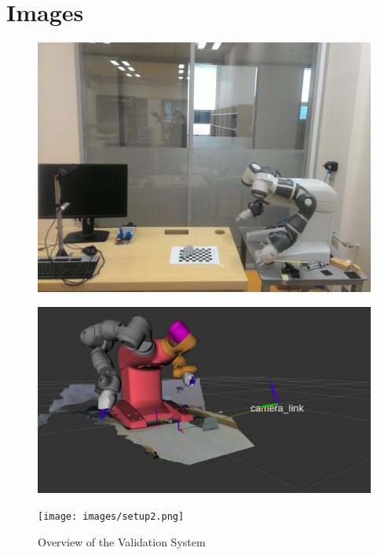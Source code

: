 \appendix
\chapter*{Images}
\label{chap:results}


\begin{figure}[htp]
\begin{center}
{
  \includegraphics[clip,width=0.5\columnwidth]{images/setup1.jpg}
}
\end{center}
\begin{center}
{
  \includegraphics[clip,width=0.5\columnwidth]{images/system1.jpg}
}
\end{center}
\begin{center}
{
  \texttt{[image: images/setup2.png]}
}
\end{center}
\caption{Overview of the Validation System}
\label{setupsystem}
\end{figure}

